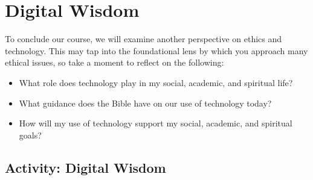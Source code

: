 \documentclass[
]{book}
\providecommand{\tightlist}{%
  \setlength{\itemsep}{0pt}\setlength{\parskip}{0pt}}
\theoremstyle{definition}
\theoremstyle{definition}
\theoremstyle{definition}
\theoremstyle{definition}
\theoremstyle{remark}
\begin{document}
\hypertarget{digital-wisdom}{%
\section{Digital Wisdom}\label{digital-wisdom}}

To conclude our course, we will examine another perspective on ethics and technology. This may tap into the foundational lens by which you approach many ethical issues, so take a moment to reflect on the following:

\begin{itemize}
\tightlist
\item
  What role does technology play in my social, academic, and spiritual life?\\
\item
  What guidance does the Bible have on our use of technology today?\\
\item
  How will my use of technology support my social, academic, and spiritual goals?
\end{itemize}

\hypertarget{activity-digital-wisdom}{%
\subsection*{Activity: Digital Wisdom}\label{activity-digital-wisdom}}
\end{document}
